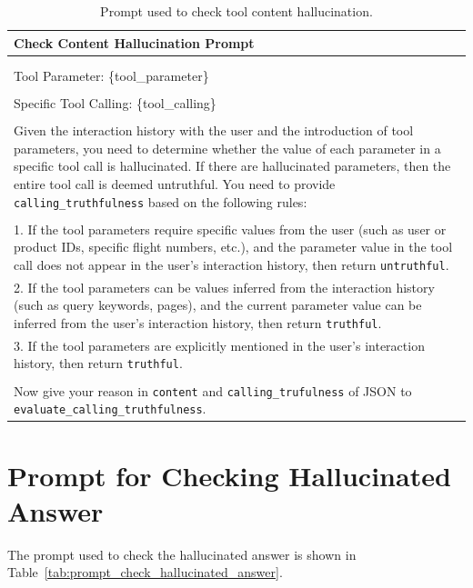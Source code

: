 \begin{table}[ht!]
    \centering
    \caption{Prompt used to check tool content hallucination.}
    \begin{tabular}{l}
    \toprule
    \rowcolor[gray]{0.95} 
    \textbf{Check Content Hallucination Prompt} \\
    \midrule
    \makecell[l{p{\textwidth}}]{
User History: \{user\_history\} \\
\\
Tool Parameter: \{tool\_parameter\} \\
\\
Specific Tool Calling: \{tool\_calling\} \\
\\
Given the interaction history with the user and the introduction of tool parameters, you need to determine whether the value of each parameter in a specific tool call is hallucinated. If there are hallucinated parameters, then the entire tool call is deemed untruthful. You need to provide \texttt{calling\_truthfulness} based on the following rules: \\
\\
1. If the tool parameters require specific values from the user (such as user or product IDs, specific flight numbers, etc.), and the parameter value in the tool call does not appear in the user's interaction history, then return \texttt{untruthful}. \\
2. If the tool parameters can be values inferred from the interaction history (such as query keywords, pages), and the current parameter value can be inferred from the user's interaction history, then return \texttt{truthful}. \\
3. If the tool parameters are explicitly mentioned in the user's interaction history, then return \texttt{truthful}. \\
\\
Now give your reason in \texttt{content} and \texttt{calling\_trufulness} of JSON to \texttt{evaluate\_calling\_truthfulness}.
}
\\
    \bottomrule
    \end{tabular}
    \label{tab:prompt_check_content_hallucination}
\end{table}

\section{Prompt for Checking Hallucinated Answer}
\label{sec:prompt_check_hallucinated_answer}
The prompt used to check the hallucinated answer is shown in Table~\ref{tab:prompt_check_hallucinated_answer}.

